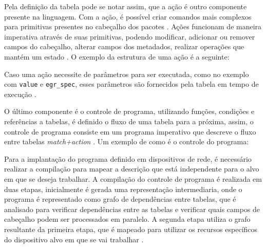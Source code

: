 \documentclass[
    12pt,
    openright, 
    oneside,
    a4paper,
    french,
    english,
    brazil
    ]{facom-ufu-abntex2}
\theoremstyle{definition}
\begin{document}


Pela definição da tabela pode se notar assim, que a ação é outro componente presente
na linguagem. Com a ação, é possível criar comandos mais complexos para primitivas
presentes no cabeçalho dos pacotes \cite{bosshart2014p4}. Ações funcionam de
maneira imperativa através de suas primitivas, podendo modificar, adicionar ou 
remover campos do cabeçalho, alterar campos dos metadados, realizar operações
que mantém um estado \cite{p4USITutorial}. O exemplo da estrutura de uma ação
é a seguinte:



Caso uma ação necessite de parâmetros para ser executada, como no exemplo com
\texttt{value} e \texttt{egr\_spec}, esses parâmetros são fornecidos pela tabela em tempo 
de execução \cite{bosshart2014p4}.

O último componente é o controle de programa, utilizando funções, condições e referências
a tabelas, é definido o fluxo de uma tabela para a próxima, assim, o controle de programa
consiste em um programa imperativo que descreve o fluxo entre tabelas \emph{match+action} 
\cite{bosshart2014p4}. Um exemplo de como é o controle do programa: 



Para a implantação do programa definido em dispositivos de rede, é necessário realizar
a compilação para mapear a descrição que está independente para o alvo em que se deseja
trabalhar. A compilação do controle de programa é realizada em duas etapas, inicialmente
é gerada uma representação intermediaria, onde o programa é representado como grafo de
dependências entre tabelas, que é analisado para verificar dependências entre as tabelas
e verificar quais campos de cabeçalho podem ser processados em paralelo. A segunda etapa
utiliza o grafo resultante da primeira etapa, que é mapeado para utilizar os recursos
específicos do dispositivo alvo em que se vai trabalhar \cite{bosshart2014p4}.
\end{document}
